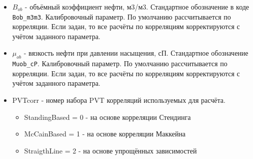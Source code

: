 \begin{itemize}
\item $B_{ob}$ - объёмный коэффициент нефти, м3/м3. Стандартное обозначение в коде \texttt{Bob_m3m3}. Калибровочный параметр. По умолчанию рассчитывается по корреляции. Если задан, то все расчёты по корреляциям корректируются с учётом заданного параметра.

\item $\mu_{ob}$ - вязкость нефти при давлении насыщения, сП. Стандартное обозначение \texttt{Muob_cP}. Калибровочный параметр. По умолчанию рассчитывается по корреляции. Если задан, то все расчёты по корреляциям корректируются с учётом заданного параметра.

\item PVTcorr - номер набора PVT корреляций используемых для расчёта. 
\begin{itemize}	
	\item 	StandingBased = 0 - на основе корреляции Стендинга
	\item 	McCainBased = 1 - на основе корреляции Маккейна
	\item 	StraigthLine = 2 - на основе упрощённых зависимостей
\end{itemize}






\end{itemize}

